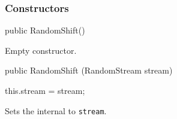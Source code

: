 \subsubsection*{Constructors}
\begin{code}

   public RandomShift() \begin{hide} {
   }
   \end{hide}
\end{code}
\begin{tabb}
   Empty constructor.
\end{tabb}
\begin{code}

   public RandomShift (RandomStream stream) \begin{hide} {
       this.stream = stream;
   }
   \end{hide}
\end{code}
\begin{tabb}
   Sets the internal
   to  \texttt{stream}.
\end{tabb}
\begin{htmlonly}
\end{htmlonly}

